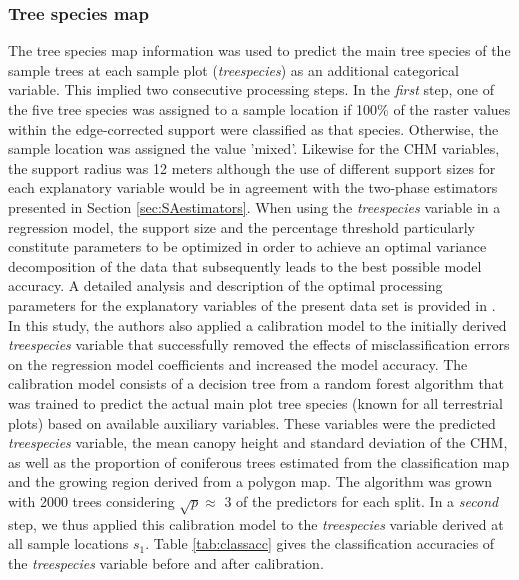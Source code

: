 \subsubsection{Tree species map}

The tree species map information was used to predict the main tree species of the sample trees at each sample plot (\textit{treespecies}) as an additional categorical variable. This implied two consecutive processing steps. In the \textit{first} step, one of the five tree species was assigned to a sample location if 100\% of the raster values within the edge-corrected support were classified as that species. Otherwise, the sample location was assigned the value 'mixed'. Likewise for the CHM variables, the support radius was 12 meters although the use of different support sizes for each explanatory variable would be in agreement with the two-phase estimators presented in Section \ref{sec:SAestimators}. When using the \textit{treespecies} variable in a regression model, the support size and the percentage threshold particularly constitute parameters to be optimized in order to achieve an optimal variance decomposition of the data that subsequently leads to the best possible model accuracy. A detailed analysis and description of the optimal processing parameters for the explanatory variables of the present data set is provided in \citet{hill2017a}. In this study, the authors also applied a calibration model to the initially derived \textit{treespecies} variable that successfully removed the effects of misclassification errors on the regression model coefficients and increased the model accuracy. The calibration model consists of a decision tree from a random forest algorithm \citet{breiman2001} that was trained to predict the actual main plot tree species (known for all terrestrial plots) based on available auxiliary variables. These variables were the predicted \textit{treespecies} variable, the mean canopy height and standard deviation of the CHM, as well as the proportion of coniferous trees estimated from the classification map and the growing region derived from a polygon map. The algorithm was grown with 2000 trees considering $\sqrt{p} \approx$ 3 of the predictors for each split. In a \textit{second} step, we thus applied this calibration model to the \textit{treespecies} variable derived at all sample locations $s_1$. Table \ref{tab:classacc} gives the classification accuracies of the \textit{treespecies} variable before and after calibration.


